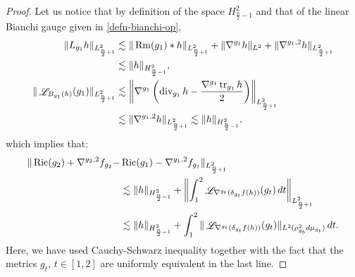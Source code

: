 \documentclass[a4paper,11pt,reqno]{amsart}
\def\Ric{\mathop{\rm Ric}\nolimits}
\def\Rm{\mathop{\rm Rm}\nolimits}
\def\tr{\mathop{\rm tr}\nolimits}
\def\div{\mathop{\rm div}\nolimits}
\def\Li{\mathop{\rm \mathscr{L}}\nolimits}
\def\Ric{\mathop{\rm Ric}\nolimits}
\def\Rm{\mathop{\rm Rm}\nolimits}
\def\tr{\mathop{\rm tr}\nolimits}
\def\div{\mathop{\rm div}\nolimits}
\def\Li{\mathop{\rm \mathscr{L}}\nolimits}
\numberwithin{equation}{section}
\begin{document}
\begin{proof}
		
		Let us notice that by definition of the space $H^2_{\frac{n}{2}-1}$ and that of the linear Bianchi gauge given in \eqref{defn-bianchi-op},
		\begin{equation*}
		\begin{split}
		\|L_{g_1}h\|_{L^2_{\frac{n}{2}+1}}&\lesssim\|\Rm(g_1)\ast h\|_{L^2_{\frac{n}{2}+1}}+\|\nabla^{g_1}h\|_{L^2}+\|\nabla^{g_1,2}h\|_{L^2_{\frac{n}{2}+1}}\\
		&\lesssim \|h\|_{H^2_{\frac{n}{2}-1}},\\
		\|\Li_{B_{g_1}(h)}(g_1)\|_{L^2_{\frac{n}{2}+1}}&\lesssim\left\|\nabla^{g_1}\left(\div_{g_1}h-\frac{\nabla^{g_1}\tr_{g_1}h}{2}\right)\right\|_{L^2_{\frac{n}{2}+1}}\\
		&\lesssim \|\nabla^{g_1,2}h\|_{L^2_{\frac{n}{2}+1}} \lesssim \|h\|_{H^2_{\frac{n}{2}-1}},
		\end{split}
		\end{equation*}
		which implies that:
		\begin{equation}
		\begin{split}\label{last-but-not-least}
		\|\Ric(g_2)+\nabla^{g_2,2}f_{g_2}-&\Ric(g_1)-\nabla^{g_1,2}f_{g_1}\|_{L^2_{\frac{n}{2}+1}}\\
		&\lesssim \|h\|_{H^2_{\frac{n}{2}-1}}+\left\|\int_1^2\Li_{\nabla^{g_t}(\delta_{g_t}f(h))}(g_t)\,dt\right\|_{L^2_{\frac{n}{2}+1}}\\
		&\lesssim \|h\|_{H^2_{\frac{n}{2}-1}}+\int_1^2\|\Li_{\nabla^{g_t}(\delta_{g_t}f(h))}(g_t)\|_{L^2(\rho_{g_b}^2d\mu_{g_t})}\,dt.
		\end{split}
		\end{equation}
		Here, we have used Cauchy-Schwarz inequality together with the fact that the metrics $g_t$, $t\in[1,2]$ are uniformly equivalent in the last line.
		

\end{proof}
\end{document}
